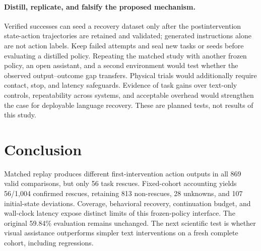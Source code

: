 \documentclass[10pt,twocolumn,letterpaper]{article}
\begin{document}
\paragraph{Distill, replicate, and falsify the proposed mechanism.}
Verified successes can seed a recovery dataset only after the postintervention state-action trajectories are retained and validated; generated instructions alone are not action labels. Keep failed attempts and seal new tasks or seeds before evaluating a distilled policy. Repeating the matched study with another frozen policy, an open assistant, and a second environment would test whether the observed output--outcome gap transfers. Physical trials would additionally require contact, stop, and latency safeguards. Evidence of task gains over text-only controls, repeatability across systems, and acceptable overhead would strengthen the case for deployable language recovery. These are planned tests, not results of this study.

\section{Conclusion}
Matched replay produces different first-intervention action outputs in all 869 valid comparisons, but only 56 task rescues. Fixed-cohort accounting yields 56/1,004 confirmed rescues, retaining 813 non-rescues, 28 unknowns, and 107 initial-state deviations. Coverage, behavioral recovery, continuation budget, and wall-clock latency expose distinct limits of this frozen-policy interface. The original 59.84\% evaluation remains unchanged. The next scientific test is whether visual assistance outperforms simpler text interventions on a fresh complete cohort, including regressions.

{\small}
\end{document}
